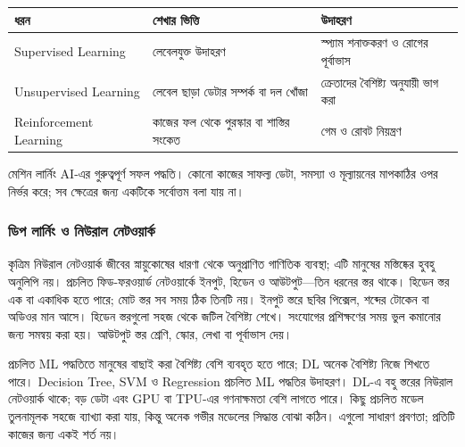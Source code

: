 \begin{topicbody}
\begin{compacttable}
\begin{tabular}{|p{}|p{}|p{}|}
\hline\textbf{ধরন} & \textbf{শেখার ভিত্তি} & \textbf{উদাহরণ}\\\hline
Supervised Learning & লেবেলযুক্ত উদাহরণ & স্প্যাম শনাক্তকরণ ও রোগের পূর্বাভাস\\\hline
Unsupervised Learning & লেবেল ছাড়া ডেটার সম্পর্ক বা দল খোঁজা & ক্রেতাদের বৈশিষ্ট্য অনুযায়ী ভাগ করা\\\hline
Reinforcement Learning & কাজের ফল থেকে পুরস্কার বা শাস্তির সংকেত & গেম ও রোবট নিয়ন্ত্রণ\\\hline
\end{tabular}
\end{compacttable}
মেশিন লার্নিং AI-এর গুরুত্বপূর্ণ সফল পদ্ধতি। কোনো কাজের সাফল্য ডেটা, সমস্যা ও মূল্যায়নের মাপকাঠির ওপর নির্ভর করে; সব ক্ষেত্রের জন্য একটিকে সর্বোত্তম বলা যায় না।
\subsubsection{ডিপ লার্নিং ও নিউরাল নেটওয়ার্ক}
কৃত্রিম নিউরাল নেটওয়ার্ক জীবের স্নায়ুকোষের ধারণা থেকে অনুপ্রাণিত গাণিতিক ব্যবস্থা; এটি মানুষের মস্তিষ্কের হুবহু অনুলিপি নয়। প্রচলিত ফিড-ফরওয়ার্ড নেটওয়ার্কে ইনপুট, হিডেন ও আউটপুট---তিন ধরনের স্তর থাকে। হিডেন স্তর এক বা একাধিক হতে পারে; মোট স্তর সব সময় ঠিক তিনটি নয়।
ইনপুট স্তরে ছবির পিক্সেল, শব্দের টোকেন বা অডিওর মান আসে। হিডেন স্তরগুলো সহজ থেকে জটিল বৈশিষ্ট্য শেখে। সংযোগের  প্রশিক্ষণের সময় ভুল কমানোর জন্য সমন্বয় করা হয়। আউটপুট স্তর শ্রেণি, স্কোর, লেখা বা পূর্বাভাস দেয়।

প্রচলিত ML পদ্ধতিতে মানুষের বাছাই করা বৈশিষ্ট্য বেশি ব্যবহৃত হতে পারে; DL অনেক বৈশিষ্ট্য নিজে শিখতে পারে। Decision Tree, SVM ও Regression প্রচলিত ML পদ্ধতির উদাহরণ। DL-এ বহু স্তরের নিউরাল নেটওয়ার্ক থাকে; বড় ডেটা এবং GPU বা TPU-এর গণনাক্ষমতা বেশি লাগতে পারে। কিছু প্রচলিত মডেল তুলনামূলক সহজে ব্যাখ্যা করা যায়, কিন্তু অনেক গভীর মডেলের সিদ্ধান্ত বোঝা কঠিন। এগুলো সাধারণ প্রবণতা; প্রতিটি কাজের জন্য একই শর্ত নয়।

\end{topicbody}

